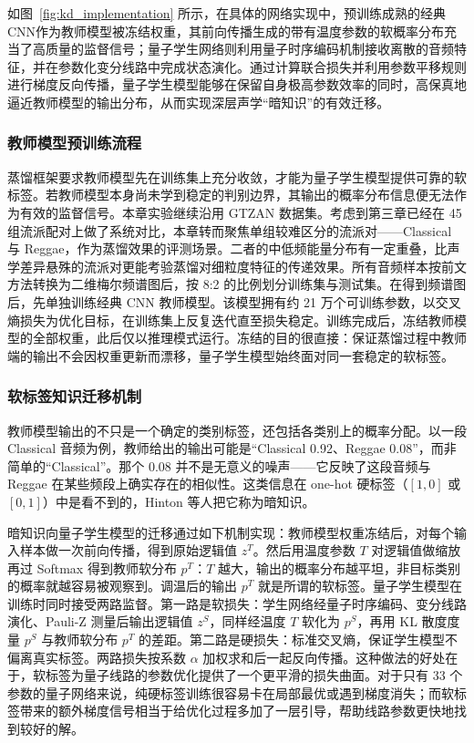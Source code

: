 如图~\ref{fig:kd_implementation} 所示，在具体的网络实现中，预训练成熟的经典CNN作为教师模型被冻结权重，其前向传播生成的带有温度参数的软概率分布充当了高质量的监督信号；量子学生网络则利用量子时序编码机制接收离散的音频特征，并在参数化变分线路中完成状态演化。通过计算联合损失并利用参数平移规则进行梯度反向传播，量子学生模型能够在保留自身极高参数效率的同时，高保真地逼近教师模型的输出分布，从而实现深层声学“暗知识”的有效迁移。

\subsubsection{教师模型预训练流程}
\label{subsec:teacher_pretrain}

蒸馏框架要求教师模型先在训练集上充分收敛，才能为量子学生模型提供可靠的软标签。若教师模型本身尚未学到稳定的判别边界，其输出的概率分布信息便无法作为有效的监督信号。本章实验继续沿用 GTZAN 数据集。考虑到第三章已经在 45 组流派配对上做了系统对比，本章转而聚焦单组较难区分的流派对——Classical 与 Reggae，作为蒸馏效果的评测场景。二者的中低频能量分布有一定重叠，比声学差异悬殊的流派对更能考验蒸馏对细粒度特征的传递效果。所有音频样本按前文方法转换为二维梅尔频谱图后，按 8:2 的比例划分训练集与测试集。在得到频谱图后，先单独训练经典 CNN 教师模型。该模型拥有约 21 万个可训练参数，以交叉熵损失为优化目标，在训练集上反复迭代直至损失稳定。训练完成后，冻结教师模型的全部权重，此后仅以推理模式运行。冻结的目的很直接：保证蒸馏过程中教师端的输出不会因权重更新而漂移，量子学生模型始终面对同一套稳定的软标签。

\subsubsection{软标签知识迁移机制}
\label{subsec:knowledge_transfer}

教师模型输出的不只是一个确定的类别标签，还包括各类别上的概率分配。以一段 Classical 音频为例，教师给出的输出可能是“Classical 0.92、Reggae 0.08”，而非简单的“Classical”。那个 0.08 并不是无意义的噪声——它反映了这段音频与 Reggae 在某些频段上确实存在的相似性。这类信息在 one-hot 硬标签（$[1, 0]$ 或 $[0, 1]$）中是看不到的，Hinton 等人把它称为暗知识。

暗知识向量子学生模型的迁移通过如下机制实现：教师模型权重冻结后，对每个输入样本做一次前向传播，得到原始逻辑值 $z^T$。然后用温度参数 $T$ 对逻辑值做缩放再过 Softmax 得到教师软分布 $p^T$：$T$ 越大，输出的概率分布越平坦，非目标类别的概率就越容易被观察到。调温后的输出 $p^T$ 就是所谓的软标签。量子学生模型在训练时同时接受两路监督。第一路是软损失：学生网络经量子时序编码、变分线路演化、Pauli-Z 测量后输出逻辑值 $z^S$，同样经温度 $T$ 软化为 $p^S$，再用 KL 散度度量 $p^S$ 与教师软分布 $p^T$ 的差距。第二路是硬损失：标准交叉熵，保证学生模型不偏离真实标签。两路损失按系数 $\alpha$ 加权求和后一起反向传播。这种做法的好处在于，软标签为量子线路的参数优化提供了一个更平滑的损失曲面。对于只有 33 个参数的量子网络来说，纯硬标签训练很容易卡在局部最优或遇到梯度消失；而软标签带来的额外梯度信号相当于给优化过程多加了一层引导，帮助线路参数更快地找到较好的解。

